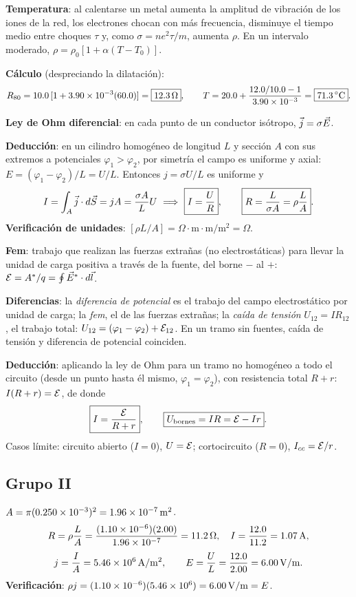 \textbf{Temperatura}: al calentarse un metal aumenta la amplitud de vibración de los iones de la red, los electrones chocan con más frecuencia, disminuye el tiempo medio entre choques $\tau$ y, como $\sigma=ne^2\tau/m$, aumenta $\rho$. En un intervalo moderado, $\rho=\rho_0[1+\alpha(T-T_0)]$.

\textbf{Cálculo} (despreciando la dilatación):
\[
R_{80}=10.0\,[1+3.90\times10^{-3}(60.0)]=\boxed{12.3\ohm},\qquad
T=20.0+\frac{12.0/10.0-1}{3.90\times10^{-3}}=\boxed{71.3\,^\circ\mathrm{C}}.
\]

\textbf{Ley de Ohm diferencial}: en cada punto de un conductor isótropo, $\vj=\sigma\vE$.

\textbf{Deducción}: en un cilindro homogéneo de longitud $L$ y sección $A$ con sus extremos a potenciales $\varphi_1>\varphi_2$, por simetría el campo es uniforme y axial: $E=(\varphi_1-\varphi_2)/L=U/L$. Entonces $j=\sigma U/L$ es uniforme y
\[
I=\int_A\vj\cdot d\vec S=jA=\frac{\sigma A}{L}U\ \Longrightarrow\ \boxed{I=\frac UR},\qquad\boxed{R=\frac{L}{\sigma A}=\rho\frac LA}.
\]
\textbf{Verificación de unidades}: $[\rho L/A]=\Omega\cdot\mathrm m\cdot\mathrm m/\mathrm{m^2}=\Omega$.

\textbf{Fem}: trabajo que realizan las fuerzas extrañas (no electrostáticas) para llevar la unidad de carga positiva a través de la fuente, del borne $-$ al $+$: $\fem=A^*/q=\oint\vE^*\cdot d\vec l$.

\textbf{Diferencias}: la \emph{diferencia de potencial} es el trabajo del campo electrostático por unidad de carga; la \emph{fem}, el de las fuerzas extrañas; la \emph{caída de tensión} $U_{12}=IR_{12}$, el trabajo total: $U_{12}=(\varphi_1-\varphi_2)+\fem_{12}$. En un tramo sin fuentes, caída de tensión y diferencia de potencial coinciden.

\textbf{Deducción}: aplicando la ley de Ohm para un tramo no homogéneo a todo el circuito (desde un punto hasta él mismo, $\varphi_1=\varphi_2$), con resistencia total $R+r$: $I(R+r)=\fem$, de donde
\[
\boxed{I=\frac{\fem}{R+r}},\qquad\boxed{U_{\text{bornes}}=IR=\fem-Ir}.
\]
Casos límite: circuito abierto ($I=0$), $U=\fem$; cortocircuito ($R=0$), $I_{cc}=\fem/r$.

\subsection*{Grupo II}
$A=\pi(0.250\times10^{-3})^2=1.96\times10^{-7}\uu{m^2}$.
\[
R=\rho\frac LA=\frac{(1.10\times10^{-6})(2.00)}{1.96\times10^{-7}}=11.2\ohm,\quad I=\frac{12.0}{11.2}=1.07\uu A,
\]
\[
j=\frac IA=5.46\times10^6\uu{A/m^2},\qquad E=\frac UL=\frac{12.0}{2.00}=6.00\uu{V/m}.
\]
\textbf{Verificación}: $\rho j=(1.10\times10^{-6})(5.46\times10^6)=6.00\uu{V/m}=E$. \checkmark

